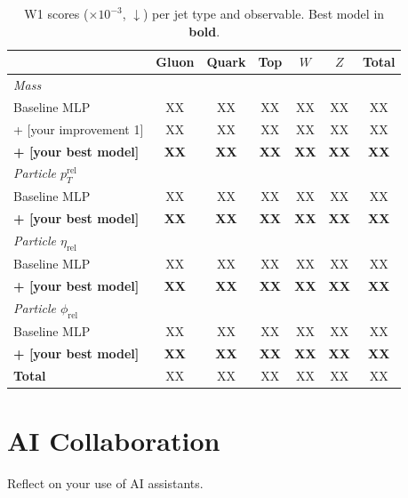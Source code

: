 \documentclass{article}
\begin{document}
\begin{table}[h]
\centering
\caption{W1 scores ($\times 10^{-3}$, $\downarrow$) per jet type and observable. Best model in \textbf{bold}.}
\begin{tabular}{@{} l ccccc c @{}}
\toprule
& Gluon & Quark & Top & $W$ & $Z$ & Total \\
\midrule
\multicolumn{7}{l}{\textit{Mass}} \\
\quad Baseline MLP & XX & XX & XX & XX & XX & XX \\
\quad + [your improvement 1] & XX & XX & XX & XX & XX & XX \\
\quad \textbf{+ [your best model]} & \textbf{XX} & \textbf{XX} & \textbf{XX} & \textbf{XX} & \textbf{XX} & \textbf{XX} \\
\midrule
\multicolumn{7}{l}{\textit{Particle $p_T^{\mathrm{rel}}$}} \\
\quad Baseline MLP & XX & XX & XX & XX & XX & XX \\
\quad \textbf{+ [your best model]} & \textbf{XX} & \textbf{XX} & \textbf{XX} & \textbf{XX} & \textbf{XX} & \textbf{XX} \\
\midrule
\multicolumn{7}{l}{\textit{Particle $\eta_{\mathrm{rel}}$}} \\
\quad Baseline MLP & XX & XX & XX & XX & XX & XX \\
\quad \textbf{+ [your best model]} & \textbf{XX} & \textbf{XX} & \textbf{XX} & \textbf{XX} & \textbf{XX} & \textbf{XX} \\
\midrule
\multicolumn{7}{l}{\textit{Particle $\phi_{\mathrm{rel}}$}} \\
\quad Baseline MLP & XX & XX & XX & XX & XX & XX \\
\quad \textbf{+ [your best model]} & \textbf{XX} & \textbf{XX} & \textbf{XX} & \textbf{XX} & \textbf{XX} & \textbf{XX} \\
\midrule
\textbf{Total} & XX & XX & XX & XX & XX & XX \\
\bottomrule
\end{tabular}
\end{table}


\section{AI Collaboration}

Reflect on your use of AI assistants.

\end{document}
